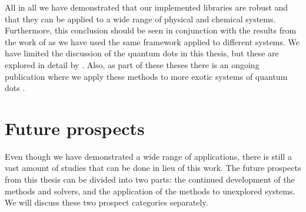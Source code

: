     All in all we have demonstrated that our implemented libraries are robust
    and that they can be applied to a wide range of physical and chemical
    systems.
    Furthermore, this conclusion should be seen in conjunction with the results
    from the work of \citeauthor{greg-winther} \cite{greg-winther} as we have used
    the same framework applied to different systems.
    We have limited the discussion of the quantum dots in this thesis, but these
    are explored in detail by \citeauthor{greg-winther}.
    Also, as part of these theses there is an ongoing publication where we apply
    these methods to more exotic systems of quantum dots \cite{td-quantum-dots}.


    \section{Future prospects}
        \label{sec:future-work}
        Even though we have demonstrated a wide range of applications, there is
        still a vast amount of studies that can be done in lieu of this work.
        The future prospects from this thesis can be divided into two parts: the
        continued development of the methods and solvers, and the application of
        the methods to unexplored systems.
        We will discuss these two prospect categories separately.

